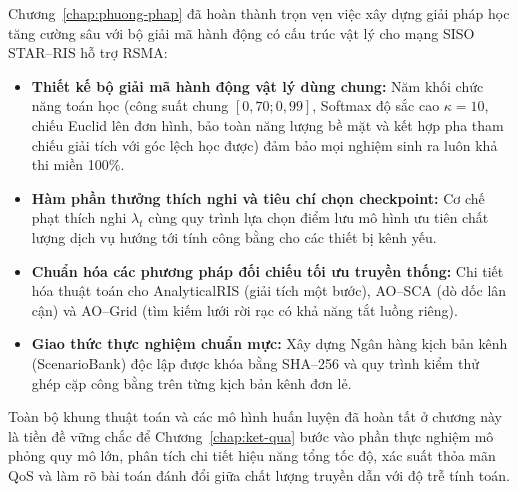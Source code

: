 Chương~\ref{chap:phuong-phap} đã hoàn thành trọn vẹn việc xây dựng giải pháp học tăng cường sâu với bộ giải mã
hành động có cấu trúc vật lý cho mạng SISO STAR--RIS hỗ trợ RSMA:
\begin{itemize}
\item \textbf{Thiết kế bộ giải mã hành động vật lý dùng chung:} Năm khối chức năng toán học (công suất chung
  $[0,70; 0,99]$, Softmax độ sắc cao $\kappa = 10$, chiếu Euclid lên đơn hình, bảo toàn năng lượng bề mặt và kết
  hợp pha tham chiếu giải tích với góc lệch học được) đảm bảo mọi nghiệm sinh ra luôn khả thi miền 100\%.
\item \textbf{Hàm phần thưởng thích nghi và tiêu chí chọn checkpoint:} Cơ chế phạt thích nghi $\lambda_t$ cùng quy
  trình lựa chọn điểm lưu mô hình ưu tiên chất lượng dịch vụ hướng tới tính công bằng cho các thiết bị kênh yếu.
\item \textbf{Chuẩn hóa các phương pháp đối chiếu tối ưu truyền thống:} Chi tiết hóa thuật toán cho AnalyticalRIS
  (giải tích một bước), AO--SCA (dò dốc lân cận) và AO--Grid (tìm kiếm lưới rời rạc có khả năng tắt luồng riêng).
\item \textbf{Giao thức thực nghiệm chuẩn mực:} Xây dựng Ngân hàng kịch bản kênh (ScenarioBank) độc lập được khóa
  bằng SHA--256 và quy trình kiểm thử ghép cặp công bằng trên từng kịch bản kênh đơn lẻ.
\end{itemize}
Toàn bộ khung thuật toán và các mô hình huấn luyện đã hoàn tất ở chương này là tiền đề vững chắc để
Chương~\ref{chap:ket-qua} bước vào phần thực nghiệm mô phỏng quy mô lớn, phân tích chi tiết hiệu năng tổng tốc độ,
xác suất thỏa mãn QoS và làm rõ bài toán đánh đổi giữa chất lượng truyền dẫn với độ trễ tính toán.
